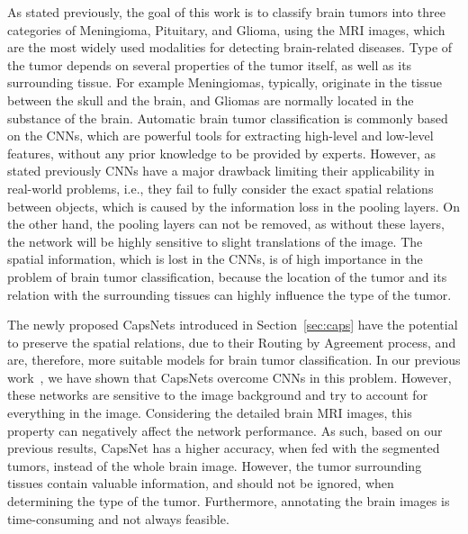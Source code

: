 \documentclass{article}
\begin{document}
As stated previously, the goal of this work is to classify brain tumors into three categories of Meningioma, Pituitary, and Glioma, using the MRI images, which are the most widely used modalities for detecting brain-related diseases. Type of the tumor depends on several properties of the tumor itself, as well as its surrounding tissue. For example Meningiomas, typically, originate in the tissue between the skull and the brain, and  Gliomas are normally located in the substance of the brain.  Automatic brain tumor classification is commonly based on the CNNs, which are powerful tools for extracting high-level and low-level features, without any prior knowledge to be provided by experts. However, as stated previously CNNs have a major drawback limiting their applicability in real-world problems, i.e., they fail to fully consider the exact spatial relations between objects, which is caused by the information loss in the pooling layers. On the other hand, the pooling layers can not be removed, as without these layers, the network will be highly sensitive to slight translations of the image. The spatial information, which is lost in the CNNs, is of high importance in the problem of brain tumor classification, because the location of the tumor and its relation with the surrounding tissues can highly influence the type of the tumor.

The newly proposed CapsNets introduced in Section~\ref{sec:caps} have the potential to preserve the spatial relations, due to their Routing by Agreement process, and are, therefore, more suitable models for brain tumor classification. In our previous work~\cite{Parnian:ICIP18}, we have shown that CapsNets overcome CNNs in this problem. However, these networks are sensitive to the image background and try to account for everything in the image. Considering the detailed brain MRI images, this property can negatively affect the network performance. As such, based on our previous results, CapsNet has a higher accuracy, when fed with the segmented tumors, instead of the whole brain image. However, the tumor surrounding tissues contain valuable information, and should not be ignored, when determining the type of the tumor. Furthermore, annotating the brain images is time-consuming and not always feasible.
\end{document}
